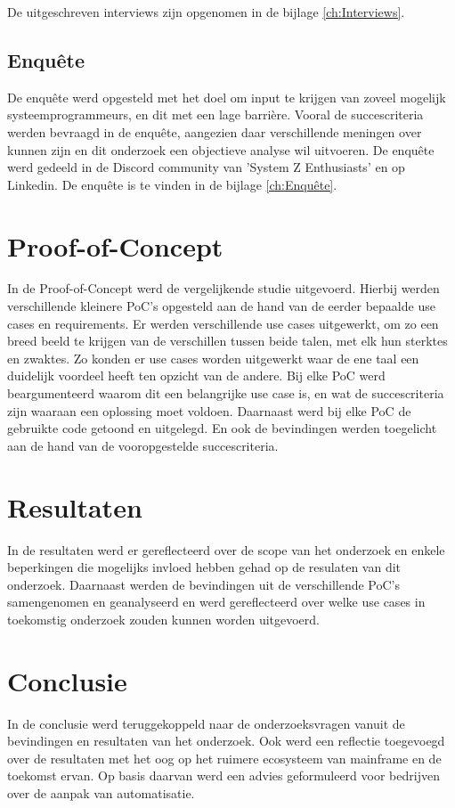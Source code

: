 De uitgeschreven interviews zijn opgenomen in de bijlage \ref{ch:Interviews}.

\subsection{Enquête}
De enquête werd opgesteld met het doel om input te krijgen van zoveel mogelijk systeemprogrammeurs, en dit met een lage barrière. Vooral de succescriteria werden bevraagd in de enquête, aangezien daar verschillende meningen over kunnen zijn en dit onderzoek een objectieve analyse wil uitvoeren. De enquête werd gedeeld in de Discord community van 'System Z Enthusiasts' en op Linkedin. De enquête is te vinden in de bijlage \ref{ch:Enquête}.

\section{Proof-of-Concept}
In de Proof-of-Concept werd de vergelijkende studie uitgevoerd. Hierbij werden verschillende kleinere PoC's opgesteld aan de hand van de eerder bepaalde use cases en requirements. Er werden verschillende use cases uitgewerkt, om zo een breed beeld te krijgen van de verschillen tussen beide talen, met elk hun sterktes en zwaktes. Zo konden er use cases worden uitgewerkt waar de ene taal een duidelijk voordeel heeft ten opzicht van de andere. Bij elke PoC werd beargumenteerd waarom dit een belangrijke use case is, en wat de succescriteria zijn waaraan een oplossing moet voldoen. Daarnaast werd bij elke PoC de gebruikte code getoond en uitgelegd. En ook de bevindingen werden toegelicht aan de hand van de vooropgestelde succescriteria.

\section{Resultaten}
In de resultaten werd er gereflecteerd over de scope van het onderzoek en enkele beperkingen die mogelijks invloed hebben gehad op de resulaten van dit onderzoek. Daarnaast werden de bevindingen uit de verschillende PoC's samengenomen en geanalyseerd en werd gereflecteerd over welke use cases in toekomstig onderzoek zouden kunnen worden uitgevoerd.

\section{Conclusie}
In de conclusie werd teruggekoppeld naar de onderzoeksvragen vanuit de bevindingen en resultaten van het onderzoek. Ook werd een reflectie toegevoegd over de resultaten met het oog op het ruimere ecosysteem van mainframe en de toekomst ervan. Op basis daarvan werd een advies geformuleerd voor bedrijven over de aanpak van automatisatie.